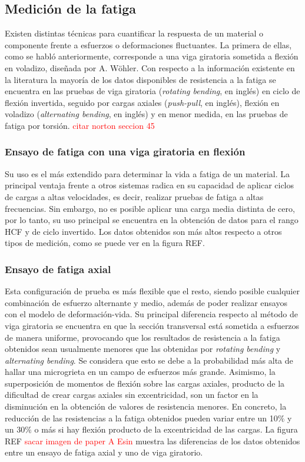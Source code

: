 \subsection{Medición de la fatiga}
Existen distintas técnicas para cuantificar la respuesta de un material o componente frente a esfuerzos o deformaciones fluctuantes. La primera de ellas, como se habló anteriormente, corresponde a una viga giratoria sometida a flexión en voladizo, diseñada por A. Wöhler. Con respecto a la información existente en la literatura la mayoría de los datos disponibles de resistencia a la fatiga se encuentra en las pruebas de viga giratoria (\textit{rotating bending}, en inglés) en ciclo de flexión invertida, seguido por cargas axiales (\textit{push-pull}, en inglés), flexión en voladizo (\textit{alternating bending}, en inglés) y en menor medida, en las pruebas de fatiga por torsión. \textcolor{red}{citar norton seccion 45}

\subsubsection{Ensayo de fatiga con una viga giratoria en flexión} 
Su uso es el más extendido para determinar la vida a fatiga de un material. La principal ventaja frente a otros sistemas radica en su capacidad de aplicar ciclos de cargas a altas velocidades, es decir, realizar pruebas de fatiga a altas frecuencias. Sin embargo, no es posible aplicar una carga media distinta de cero, por lo tanto, su uso principal se encuentra en la obtención de datos para el rango HCF y de ciclo invertido. Los datos obtenidos son más altos respecto a otros tipos de medición, como se puede ver en la figura REF.


\subsubsection{Ensayo de fatiga axial}
Esta configuración de prueba es más flexible que el resto, siendo posible cualquier combinación de esfuerzo alternante y medio, además de poder realizar ensayos con el modelo de deformación-vida. Su principal diferencia respecto al método de viga giratoria se encuentra en que la sección transversal está sometida a esfuerzos de manera uniforme, provocando que los resultados de resistencia a la fatiga obtenidos sean usualmente menores que las obtenidas por \textit{rotating bending} y \textit{alternating bending}. Se considera que esto se debe a la  probabilidad más alta de hallar una microgrieta en un campo de esfuerzos más grande. Asimismo, la superposición de momentos de flexión sobre las cargas axiales, producto de la dificultad de crear cargas axiales sin excentricidad, son un factor en la disminución en la obtención de valores de resistencia menores. En concreto, la reducción de las resistencias a la fatiga obtenidos pueden variar entre un 10$\%$ y un 30$\%$ o más si hay flexión producto de la excentricidad de las cargas. La figura REF \textcolor{red}{sacar imagen de paper A Esin} muestra las diferencias de los datos obtenidos entre un ensayo de fatiga axial y uno de viga giratorio.

